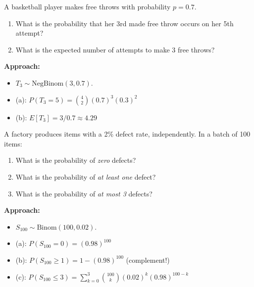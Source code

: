 \documentclass[11pt]{article}
\begin{document}
\vspace{0.4cm}

\begin{practicebox}
A basketball player makes free throws with probability $p = 0.7$.
\begin{enumerate}[label=(\alph*), nosep]
  \item What is the probability that her 3rd made free throw occurs on her 5th attempt?
  \item What is the expected number of attempts to make 3 free throws?
\end{enumerate}
\end{practicebox}

\textbf{Approach:}
\begin{itemize}[nosep]
  \item $T_3 \sim \text{NegBinom}(3, 0.7)$.
  \item (a): $P(T_3 = 5) = \binom{4}{2}(0.7)^3(0.3)^2$
  \item (b): $E[T_3] = 3/0.7 \approx 4.29$
\end{itemize}

\vspace{0.4cm}

\begin{practicebox}
A factory produces items with a 2\% defect rate, independently. In a batch of 100 items:
\begin{enumerate}[label=(\alph*), nosep]
  \item What is the probability of \emph{zero} defects?
  \item What is the probability of \emph{at least one} defect?
  \item What is the probability of \emph{at most 3} defects?
\end{enumerate}
\end{practicebox}

\textbf{Approach:}
\begin{itemize}[nosep]
  \item $S_{100} \sim \text{Binom}(100, 0.02)$.
  \item (a): $P(S_{100} = 0) = (0.98)^{100}$
  \item (b): $P(S_{100} \geq 1) = 1 - (0.98)^{100}$ \quad (complement!)
  \item (c): $P(S_{100} \leq 3) = \sum_{k=0}^{3} \binom{100}{k}(0.02)^k(0.98)^{100-k}$
\end{itemize}

\vspace{0.4cm}
\end{document}
